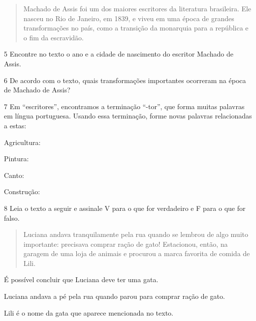\begin{quote}
Machado de Assis foi um dos maiores escritores da literatura
brasileira. Ele nasceu no Rio de Janeiro, em 1839, e viveu em uma época
de grandes transformações no país, como a transição da monarquia para a
república e o fim da escravidão.

\end{quote}

\num{5} Encontre no texto o ano e a cidade de nascimento do escritor Machado de Assis.


\num{6} De acordo com o texto, quais transformações importantes ocorreram na época de Machado de Assis?


\pagebreak
\num{7} Em “escritores”, encontramos a terminação “-tor”, que forma muitas palavras em língua portuguesa. Usando essa terminação, forme novas palavras relacionadas a estas:

\begin{escolha}
\item Agricultura: 

\item Pintura: 

\item Canto: 

\item Construção: 
\end{escolha}

\num{8} Leia o texto a seguir e assinale V para o que for verdadeiro e F para o que for falso.

\begin{quote}
Luciana andava tranquilamente pela rua quando se lembrou de algo muito
importante: precisava comprar ração de gato! Estacionou, então, na
garagem de uma loja de animais e procurou a marca favorita de comida de
Lili.

\end{quote}

\begin{boxlist}
 É possível concluir que Luciana deve ter uma gata.

 Luciana andava a pé pela rua quando parou para comprar ração de gato.

 Lili é o nome da gata que aparece mencionada no texto.
\end{boxlist}

